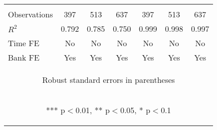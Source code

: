 \documentclass[]{article}
\begin{document}
\begin{center}
\begin{tabular}{lcccccc}
\vspace{4pt} & \begin{footnotesize}\end{footnotesize} & \begin{footnotesize}\end{footnotesize} & \begin{footnotesize}\end{footnotesize} & \begin{footnotesize}\end{footnotesize} & \begin{footnotesize}\end{footnotesize} & \begin{footnotesize}\end{footnotesize} \\
Observations & 397 & 513 & 637 & 397 & 513 & 637 \\
$R^2$ & 0.792 & 0.785 & 0.750 & 0.999 & 0.998 & 0.997 \\
Time FE & No & No & No & No & No & No \\
 Bank FE & Yes & Yes & Yes & Yes & Yes & Yes \\ \hline
\multicolumn{7}{c}{\begin{footnotesize} Robust standard errors in parentheses\end{footnotesize}} \\
\multicolumn{7}{c}{\begin{footnotesize} *** p$<$0.01, ** p$<$0.05, * p$<$0.1\end{footnotesize}} \\
\end{tabular}
\end{center}
\end{document}
